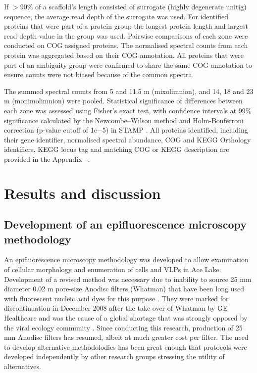 If $>$90\% of a scaffold’s length consisted of surrogate (highly degenerate unitig) sequence, the average read depth of the surrogate was used. 
For identified proteins that were part of a protein group the longest protein length and largest read depth value in the group was used. 
Pairwise comparisons of each zone were conducted on \ac{COG} assigned proteins. 
The normalised spectral counts from each protein was aggregated based on their \ac{COG} annotation. 
All proteins that were part of an ambiguity group were confirmed to share the same \ac{COG} annotation to ensure counts were not biased because of the common spectra.

The summed spectral counts from 5 and 11.5 m (mixolimnion), and 14, 18 and 23 m (monimolimnion) were pooled. 
Statistical significance of differences between each zone was assessed using Fisher's exact test, with confidence intervals at 99\% significance calculated by the Newcombe–Wilson method and Holm-Bonferroni correction (p-value cutoff of 1e$-$5) in \ac{STAMP} \cite{Parks2010}. 
All proteins identified, including their gene identifier, normalised spectral abundance, \ac{COG} and \ac{KEGG} Orthology identifiers, \ac{KEGG} locus tag and matching \ac{COG} or \ac{KEGG} description are provided in the Appendix --.




\section{Results and discussion}

\subsection[Development of an epifluorescence microscopy methodology]{Development of an epifluorescence microscopy methodology}
An epifluorescence microscopy methodology was developed to allow examination of cellular morphology and enumeration of cells and \acp{VLP} in Ace Lake.
Development of a revised method was necessary due to inability to source 25 mm diameter 0.02 \textmu{}m pore-size Anodisc filters (Whatman) that have been long used with fluorescent nucleic acid dyes for this purpose \cite{Hennes1995, Noble1998, Patel2007}. 
They were marked for discontinuation in December 2008 after the take over of Whatman by \textsc{GE} Healthcare and was the cause of a global shortage that was strongly opposed by the viral ecology community \cite{Torrice2009}.
Since conducting this research, production of 25 mm Anodisc filters has resumed, albeit at much greater cost per filter. 
The need to develop alternative methodolodies has been great enough that protocols were developed independently by other research groups \cite{Budinoff2011, Diemer2012} stressing the utility of alternatives.


